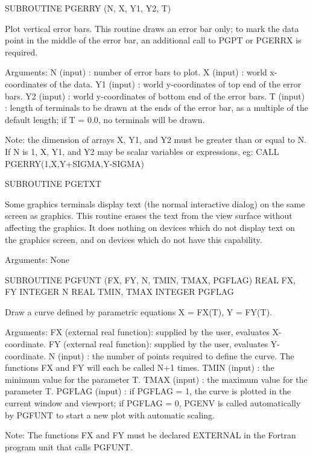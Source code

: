 {\eightpoint\begintt
      SUBROUTINE PGERRY (N, X, Y1, Y2, T)
 
Plot vertical error bars.
This routine draws an error bar only; to mark the data point in
the middle of the error bar, an additional call to PGPT or
PGERRX is required.
 
Arguments:
 N      (input)  : number of error bars to plot.
 X      (input)  : world x-coordinates of the data.
 Y1     (input)  : world y-coordinates of top end of the
                   error bars.
 Y2     (input)  : world y-coordinates of bottom end of the
                   error bars.
 T      (input)  : length of terminals to be drawn at the ends
                   of the error bar, as a multiple of the default
                   length; if T = 0.0, no terminals will be drawn.
 
Note: the dimension of arrays X, Y1, and Y2 must be greater
than or equal to N. If N is 1, X, Y1, and Y2 may be scalar
variables or expressions, eg:
      CALL PGERRY(1,X,Y+SIGMA,Y-SIGMA)
\endtt}

{\eightpoint\begintt
      SUBROUTINE PGETXT
 
Some graphics terminals display text (the normal interactive dialog)
on the same screen as graphics. This routine erases the text from the
view surface without affecting the graphics. It does nothing on
devices which do not display text on the graphics screen, and on
devices which do not have this capability.
 
Arguments:
 None
\endtt}

{\eightpoint\begintt
      SUBROUTINE PGFUNT (FX, FY, N, TMIN, TMAX, PGFLAG)
      REAL FX, FY
      INTEGER N
      REAL TMIN, TMAX
      INTEGER PGFLAG
 
Draw a curve defined by parametric equations X = FX(T), Y = FY(T).
 
Arguments:
 FX     (external real function): supplied by the user, evaluates
                   X-coordinate.
 FY     (external real function): supplied by the user, evaluates
                   Y-coordinate.
 N      (input)  : the number of points required to define the
                   curve. The functions FX and FY will each be
                   called N+1 times.
 TMIN   (input)  : the minimum value for the parameter T.
 TMAX   (input)  : the maximum value for the parameter T.
 PGFLAG (input)  : if PGFLAG = 1, the curve is plotted in the
                   current window and viewport; if PGFLAG = 0,
                   PGENV is called automatically by PGFUNT to
                   start a new plot with automatic scaling.
 
Note: The functions FX and FY must be declared EXTERNAL in the
Fortran program unit that calls PGFUNT.
\endtt}

